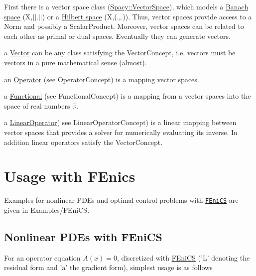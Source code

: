 \begin{DoxyItemize}
\item \-First there is a vector space class (\hyperlink{classSpacy_1_1VectorSpace}{\-Spacy\-::\-Vector\-Space}), which models a \hyperlink{namespaceSpacy_a0b66c8f2345b693504180dc7fb187958}{\-Banach space}  (\-X,$|$$|$.$|$$|$) or a \hyperlink{namespaceSpacy_a927756dd42df3e79c302df1f8f635b65}{\-Hilbert space}  (\-X,(.,.)). \-Thus, vector spaces provide access to a \-Norm and possibly a \-Scalar\-Product. \-Moreover, vector spaces can be related to each other as primal or dual spaces. \-Eventually they can generate vectors.
\item a \hyperlink{classSpacy_1_1Vector}{\-Vector} can be any class satisfying the \-Vector\-Concept, i.\-e. vectors must be vectors in a pure mathematical sense (almost).
\item an \hyperlink{classSpacy_1_1Operator}{\-Operator} (see \-Operator\-Concept) is a mapping vector spaces.
\item a \hyperlink{classSpacy_1_1Functional}{\-Functional} (see \-Functional\-Concept) is a mapping from a vector spaces into the space of real numbers $ \mathbb{R} $.
\item a \hyperlink{classSpacy_1_1LinearOperator}{\-Linear\-Operator}( see \-Linear\-Operator\-Concept) is a linear mapping between vector spaces that provides a solver for numerically evaluating its inverse. \-In addition linear operators satisfy the \-Vector\-Concept.
\end{DoxyItemize}\hypertarget{index_sec_usage_fenics}{}\section{\-Usage with F\-Enics}\label{index_sec_usage_fenics}
\-Examples for nonlinear \-P\-D\-Es and optimal control problems with \href{http://www.fenicsproject.org}{\tt \-F\-Eni\-C\-S} are given in \-Examples/\-F\-Eni\-C\-S.\hypertarget{index_sub_usage_fenics_pde}{}\subsection{\-Nonlinear P\-D\-Es with F\-Eni\-C\-S}\label{index_sub_usage_fenics_pde}
\-For an operator equation $A(x)=0$, discretized with \hyperlink{namespaceSpacy_1_1FEniCS}{\-F\-Eni\-C\-S} ('\-L' denoting the residual form and 'a' the gradient form), simplest usage is as follows 
